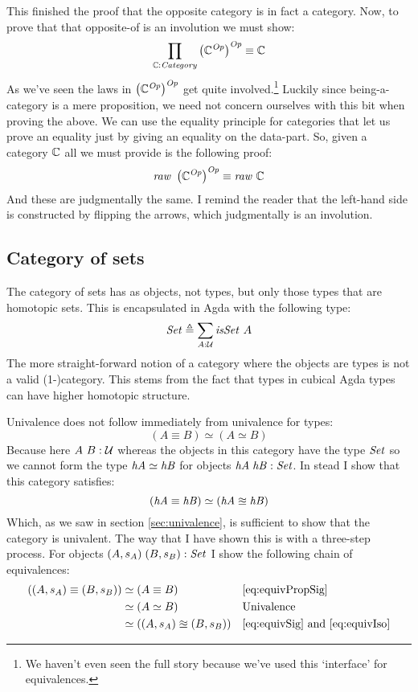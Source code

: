 This finished the proof that the opposite category is in fact a category. Now,
to prove that that opposite-of is an involution we must show:
%
$$
\prod_{\mathbb{C} \mathrel{:} \mathit{Category}} \left(\mathbb{C}^{\mathit{Op}}\right)^{\mathit{Op}} \equiv \mathbb{C}
$$
%
As we've seen the laws in $\left(\mathbb{C}^{\mathit{Op}}\right)^{\mathit{Op}}$ get quite
involved.\footnote{We haven't even seen the full story because we've used this
  `interface' for equivalences.} Luckily since being-a-category is a mere
proposition, we need not concern ourselves with this bit when proving the above.
We can use the equality principle for categories that let us prove an equality
just by giving an equality on the data-part. So, given a category $\mathbb{C}$ all we
must provide is the following proof:
%
$$
\var{raw}\ \left(\bC^{\var{Op}}\right)^{\var{Op}} \equiv \var{raw}\ \bC
$$
%
And these are judgmentally the same. I remind the reader that the left-hand side
is constructed by flipping the arrows, which judgmentally is an involution.

\subsection{Category of sets}
The category of sets has as objects, not types, but only those types that are
homotopic sets. This is encapsulated in Agda with the following type:
%
$$\Set \defeq \sum_{A \tp \MCU} \isSet\ A$$
%
The more straight-forward notion of a category where the objects are types is
not a valid \mbox{(1-)category}. This stems from the fact that types in cubical
Agda types can have higher homotopic structure.

Univalence does not follow immediately from univalence for types:
%
$$(A \equiv B) \simeq (A \simeq B)$$
%
Because here $A\ B \mathrel{:} \mathcal{U}$ whereas the objects in this category have the type
$\mathit{Set}$ so we cannot form the type $\mathit{hA} \simeq \mathit{hB}$ for objects
$\mathit{hA}\;\mathit{hB} \mathrel{:} \mathit{Set}$. In stead I show that this category
satisfies:
%
$$
(\mathit{hA} \equiv \mathit{hB}) \simeq (\mathit{hA} \approxeq \mathit{hB})
$$
%
Which, as we saw in section \ref{sec:univalence}, is sufficient to show that the
category is univalent. The way that I have shown this is with a three-step
process. For objects $(A, s_A)\; (B, s_B) \mathrel{:} \mathit{Set}$ I show the following chain
of equivalences:
%
\begin{align*}
((A, s_A) \equiv (B, s_B))
 & \simeq (A \equiv B) && \ref{eq:equivPropSig} \\
 & \simeq (A \simeq B) && \text{Univalence} \\
 & \simeq ((A, s_A) \approxeq (B, s_B)) && \text{\ref{eq:equivSig} and \ref{eq:equivIso}}
\end{align*}

